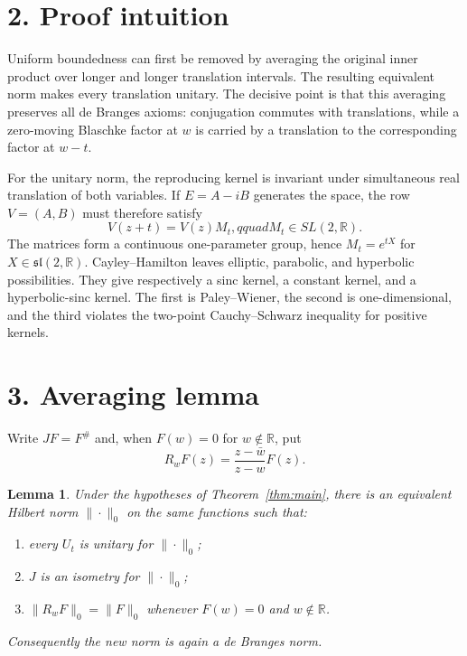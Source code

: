 \documentclass[11pt]{article}
\newtheorem{lemma}{Lemma}
\newcommand{\R}{\mathbb R}
\begin{document}
\section*{2. Proof intuition}

Uniform boundedness can first be removed by averaging the original inner
product over longer and longer translation intervals.  The resulting
equivalent norm makes every translation unitary.  The decisive point is that
this averaging preserves all de Branges axioms: conjugation commutes with
translations, while a zero-moving Blaschke factor at $w$ is carried by a
translation to the corresponding factor at $w-t$.

For the unitary norm, the reproducing kernel is invariant under simultaneous
real translation of both variables.  If $E=A-iB$ generates the space, the row
$V=(A,B)$ must therefore satisfy
\[
 V(z+t)=V(z)M_t,qquad M_t\in SL(2,\R).
\]
The matrices form a continuous one-parameter group, hence $M_t=e^{tX}$ for
$X\in\mathfrak{sl}(2,\R)$.  Cayley--Hamilton leaves elliptic, parabolic, and
hyperbolic possibilities.  They give respectively a sinc kernel, a constant
kernel, and a hyperbolic-sinc kernel.  The first is Paley--Wiener, the second
is one-dimensional, and the third violates the two-point Cauchy--Schwarz
inequality for positive kernels.

\section*{3. Averaging lemma}

Write $J F=F^\#$ and, when $F(w)=0$ for $w\notin\R$, put
\[
 R_wF(z)=\frac{z-\bar w}{z-w}F(z).
\]

\begin{lemma}\label{lem:average}
Under the hypotheses of Theorem~\ref{thm:main}, there is an equivalent Hilbert
norm $\|\cdot\|_0$ on the same functions such that:
\begin{enumerate}
\item every $U_t$ is unitary for $\|\cdot\|_0$;
\item $J$ is an isometry for $\|\cdot\|_0$;
\item $\|R_wF\|_0=\|F\|_0$ whenever $F(w)=0$ and $w\notin\R$.
\end{enumerate}
Consequently the new norm is again a de Branges norm.
\end{lemma}
\end{document}
